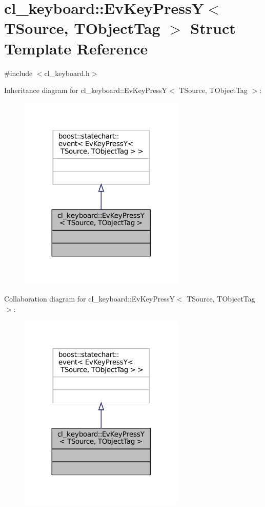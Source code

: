 \hypertarget{structcl__keyboard_1_1EvKeyPressY}{}\section{cl\+\_\+keyboard\+:\+:Ev\+Key\+PressY$<$ T\+Source, T\+Object\+Tag $>$ Struct Template Reference}
\label{structcl__keyboard_1_1EvKeyPressY}


{\ttfamily \#include $<$cl\+\_\+keyboard.\+h$>$}



Inheritance diagram for cl\+\_\+keyboard\+:\+:Ev\+Key\+PressY$<$ T\+Source, T\+Object\+Tag $>$\+:
\nopagebreak
\begin{figure}[H]
\begin{center}
\leavevmode
\includegraphics[width=224pt]{structcl__keyboard_1_1EvKeyPressY__inherit__graph}
\end{center}
\end{figure}


Collaboration diagram for cl\+\_\+keyboard\+:\+:Ev\+Key\+PressY$<$ T\+Source, T\+Object\+Tag $>$\+:
\nopagebreak
\begin{figure}[H]
\begin{center}
\leavevmode
\includegraphics[width=224pt]{structcl__keyboard_1_1EvKeyPressY__coll__graph}
\end{center}
\end{figure}


